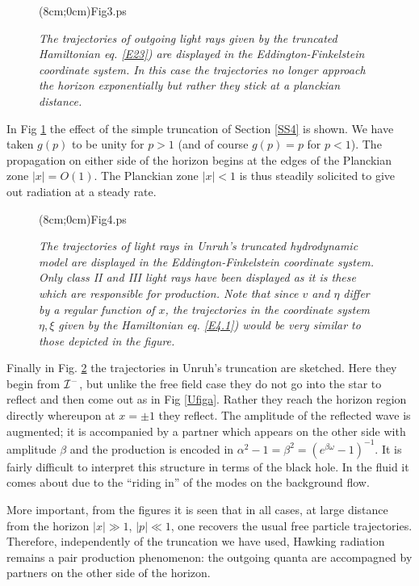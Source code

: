 \documentclass[12pt]{article}
\newcommand{\figprov}[4]{
\begin{figure}[hbt]
\begin{center}\mbox{\psboxto(#1;0cm){#4}}\end{center}
\caption{\it #3}
\label{#2}
\end{figure}
}
\begin{document}
\figprov{8cm}{Ufigb}{The trajectories of outgoing light rays
given by the truncated Hamiltonian eq. \protect\ref{E23}) are displayed in the
Eddington-Finkelstein coordinate system. In this case the
trajectories no longer approach the horizon exponentially
but rather they stick at a planckian distance.}{Fig3.ps} 



In Fig \ref{Ufigb} the effect of the simple truncation of Section \ref{SS4}
is shown. We have taken $g(p)$ to be unity for $p>1$ (and of course
$g(p)=p$ for $p<1$). The propagation on either side of the horizon begins at
the edges of the Planckian zone $\vert x \vert =O( 1)$. The Planckian zone
$\vert x \vert <1$ is thus steadily solicited to give out radiation at a steady
rate.

\figprov{8cm}{Ufigc}{The  trajectories of  light rays 
in Unruh's truncated hydrodynamic model are displayed in the Eddington-Finkelstein coordinate
system. Only class II and III light rays have been displayed as it is these
which are responsible for production.  Note that since $v$
and $\eta$ differ by a regular function of $x$, the
trajectories in the coordinate system $\eta , \xi$ given by the
Hamiltonian eq. \protect\ref{E4.1}) would be very similar to those depicted in
the figure.}{Fig4.ps} 



Finally in Fig. \ref{Ufigc} the trajectories in Unruh's truncation are
sketched. Here they begin from ${\cal I}^-$, but unlike the free field case
they do not go into the star to reflect and then come out as in Fig
\ref{Ufiga}. Rather they reach the horizon region directly whereupon at 
$ x =\pm 1$ they reflect. The amplitude of the reflected wave is augmented; it
is accompanied by a partner which appears on the other side with amplitude
$\beta$ and the production is encoded in $\alpha^2 - 1 = \beta^2 = (e^{\beta
\omega} -1 )^{-1}$. It is fairly difficult to interpret this structure in terms
of the black hole. In the fluid it comes about due to the ``riding in'' of the
modes on the background flow.
\par More important, from the figures it is seen that in all cases, at
large distance from the horizon $\vert x \vert \gg 1$, $\vert p \vert
\ll 1$, one recovers the usual free particle trajectories. Therefore,
independently of the truncation we have used, Hawking radiation remains
a pair production phenomenon: the outgoing quanta are accompagned by
partners on the other side of the horizon.
\end{document}
